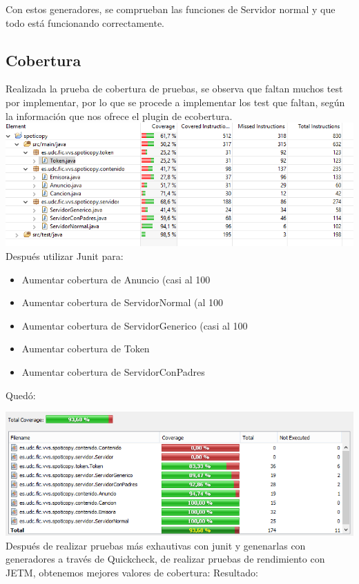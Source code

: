 \documentclass[12pt, a4paper, titlepage]{article}
\begin{document}
	Con estos generadores, se comprueban las funciones de Servidor normal y que todo está funcionando correctamente.
	
	\subsection{Cobertura}
	Realizada la prueba de cobertura de pruebas, se observa que faltan muchos test por implementar, por lo que se procede a implementar los test que faltan, según la información que nos ofrece el plugin de ecobertura.\\
	\includegraphics[width=15cm]{Imagenes/CoberturaSemana1.png} \\
	
	Después utilizar Junit para:
	\begin{itemize}
		\item Aumentar cobertura de Anuncio (casi al 100%
		\item Aumentar cobertura de ServidorNormal (al 100%
		\item Aumentar cobertura de ServidorGenerico (casi al 100%
		\item Aumentar cobertura de Token 
		\item Aumentar cobertura de ServidorConPadres
	\end{itemize}
Quedó:
	
	\includegraphics[width=15cm]{Imagenes/CoberturaSemana2.png} \\
	
	Después de realizar pruebas más exhautivas con junit y genenarlas con generadores a través de Quickcheck, de realizar pruebas de rendimiento con JETM, obtenemos mejores valores de cobertura:
	Resultado:
	
\end{document}
